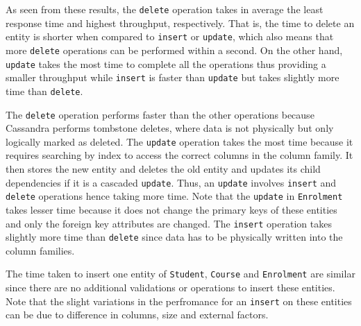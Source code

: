 As seen from these results,  the \texttt{delete} operation takes in average the
least response time and  highest throughput,  respectively.  That is,  the time to
delete an entity is shorter when compared to \texttt{insert} or \texttt{update}, 
which also means that more \texttt{delete} operations can be performed within a
second.  On the other hand,  \texttt{update} takes the most time to complete all
the operations thus providing a smaller throughput while \texttt{insert} is
faster than \texttt{update} but takes slightly more time than \texttt{delete}. 

The \texttt{delete} operation performs faster than the other operations because
Cassandra performs  tombstone deletes,  where data is not physically but only
logically marked as deleted.  The \texttt{update} operation takes the most time
because it requires searching by index to access the correct columns in the
column family.  It then stores the new entity and deletes  the old entity and
updates its child dependencies if it is a cascaded \texttt{update}.  Thus,   an
\texttt{update} involves  \texttt{insert} and  \texttt{delete} operations
hence taking more time.  Note that the \texttt{update} in \texttt{Enrolment}
takes lesser time because it does not change the primary keys of these entities
and only the foreign key attributes are changed.  %
The \texttt{insert} operation takes slightly more time than \texttt{delete}
since data has to be physically written into the column families. 

The time taken to insert one entity of \texttt{Student},  \texttt{Course} and
\texttt{Enrolment} are similar since there are no additional validations or
operations to insert these entities.  Note that the slight variations in the
perfromance for an \texttt{insert} on these entities can be due to
difference in columns,  size and external factors. 